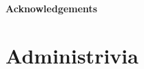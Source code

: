 \documentclass[12pt,a4paper]{article}
\newcommand{\ispdf}{0}       %
\newcommand{\iscolor}{1}     %
\newcommand{\istwosided}{0}  %
\begin{document}
%
\renewcommand{\thepage}{} %
%
\begin{latexonly}
  
\end{latexonly}
\begin{htmlonly}
  
\end{htmlonly}
%
%
\begin{latexonly}
\cleardoublepage
\vspace*{3cm}
\begin{center}{\large \bf Acknowledgements}\end{center}\par

\end{latexonly}
%
\cleardoublepage
\pagestyle{fancy}
\fancyhead{} %
\fancyfoot{} %
\latex{\ifthenelse{\equal{\istwosided}{1}}{}{}}
%
%
\setcounter{page}{1}
\renewcommand{\thepage}{\roman{page}} %
\tableofcontents
\listoffigures
\cleardoublepage
%
%
%
\renewcommand{\thepage}{\arabic{page}} %
\setcounter{page}{1}                   %
\pagestyle{fancy}                      %
%
%
\section{Administrivia}\label{admin}
\end{document}
